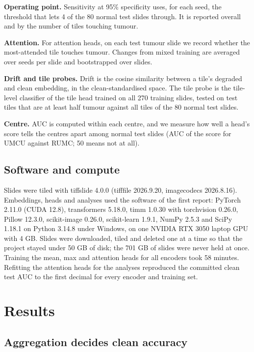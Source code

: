 \documentclass[11pt,a4paper]{article}
\begin{document}
\textbf{Operating point.} Sensitivity at 95\% specificity uses, for each seed, the threshold that lets 4 of the 80 normal test slides through. It is reported overall and by the number of tiles touching tumour.

\textbf{Attention.} For attention heads, on each test tumour slide we record whether the most-attended tile touches tumour. Changes from mixed training are averaged over seeds per slide and bootstrapped over slides.

\textbf{Drift and tile probes.} Drift is the cosine similarity between a tile's degraded and clean embedding, in the clean-standardised space. The tile probe is the tile-level classifier of the tile head trained on all 270 training slides, tested on test tiles that are at least half tumour against all tiles of the 80 normal test slides.

\textbf{Centre.} AUC is computed within each centre, and we measure how well a head's score tells the centres apart among normal test slides (AUC of the score for UMCU against RUMC; 50 means not at all).

\subsection{Software and compute}

Slides were tiled with tiffslide 4.0.0 (tifffile 2026.9.20, imagecodecs 2026.8.16). Embeddings, heads and analyses used the software of the first report: PyTorch 2.11.0 (CUDA 12.8), transformers 5.18.0, timm 1.0.30 with torchvision 0.26.0, Pillow 12.3.0, scikit-image 0.26.0, scikit-learn 1.9.1, NumPy 2.5.3 and SciPy 1.18.1 on Python 3.14.8 under Windows, on one NVIDIA RTX 3050 laptop GPU with 4 GB. Slides were downloaded, tiled and deleted one at a time so that the project stayed under 50 GB of disk; the 701 GB of slides were never held at once. Training the mean, max and attention heads for all encoders took 58 minutes. Refitting the attention heads for the analyses reproduced the committed clean test AUC to the first decimal for every encoder and training set.

\section{Results}

\subsection{Aggregation decides clean accuracy}
\end{document}
